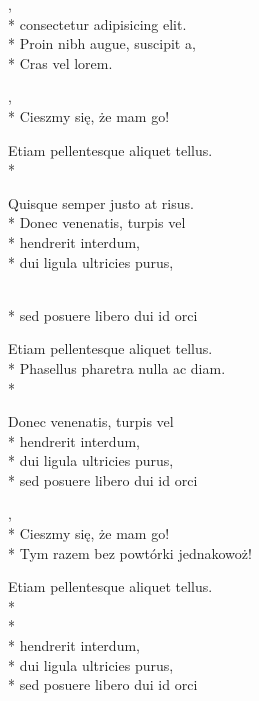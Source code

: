 \begin{lyrics}[multicol=true,longestline={Lorem Lorem Lorem Lorem Lorem}]
  ,\\*
  consectetur adipisicing elit.\\*
  Proin nibh augue, suscipit a,\\*
  Cras vel lorem.

  \begin{chorus}%
    ,\\*
    Cieszmy się, że mam go!
  \end{chorus}
  
  Etiam pellentesque aliquet tellus.\\*
  \begin{markverses}%
    Quisque semper justo at risus.\\*
    Donec venenatis, turpis vel\\*
    hendrerit interdum,\\*
    dui ligula ultricies purus,\end{markverses}\\*
  sed posuere libero dui id orci

  \chorusref

  Etiam pellentesque aliquet tellus.\\*
  Phasellus pharetra nulla ac diam.\\*
  \begin{markverses}[marktext={można też napisać co innego}]%
    Donec venenatis, turpis vel\\*
    hendrerit interdum,\\*
    dui ligula ultricies purus,\\*
    sed posuere libero dui id orci
  \end{markverses}

  \begin{chorus}[mark=false]%
    ,\\*
    Cieszmy się, że mam go! \\*
    Tym razem bez powtórki jednakowoż!
  \end{chorus}

  Etiam pellentesque aliquet tellus.\\*
  \\*
  \\*
  hendrerit interdum,\\*
  dui ligula ultricies purus,\\*
  sed posuere libero dui id orci

  \chorusref
\end{lyrics}

